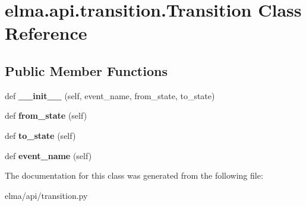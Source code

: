 \hypertarget{classelma_1_1api_1_1transition_1_1Transition}{}\section{elma.\+api.\+transition.\+Transition Class Reference}
\label{classelma_1_1api_1_1transition_1_1Transition}
\subsection*{Public Member Functions}
\begin{DoxyCompactItemize}
\item 
\mbox{\label{classelma_1_1api_1_1transition_1_1Transition_a7356a55e17ab1c10419e4b61a778e08e}} 
def {\bfseries \+\_\+\+\_\+init\+\_\+\+\_\+} (self, event\+\_\+name, from\+\_\+state, to\+\_\+state)
\item 
\mbox{\label{classelma_1_1api_1_1transition_1_1Transition_a123ea144d7e16b79186865203cbc3dd4}} 
def {\bfseries from\+\_\+state} (self)
\item 
\mbox{\label{classelma_1_1api_1_1transition_1_1Transition_a62296c6ca7b1e1e75a1fa022be2998f6}} 
def {\bfseries to\+\_\+state} (self)
\item 
\mbox{\label{classelma_1_1api_1_1transition_1_1Transition_a198b5050c2e6943c365fdc611aa81841}} 
def {\bfseries event\+\_\+name} (self)
\end{DoxyCompactItemize}


The documentation for this class was generated from the following file\+:\begin{DoxyCompactItemize}
\item 
elma/api/transition.\+py\end{DoxyCompactItemize}
